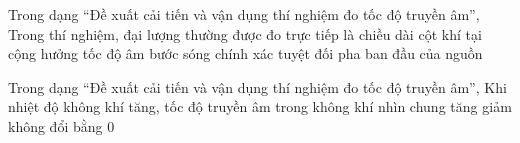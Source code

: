 \begin{ex}
Trong dạng “Đề xuất cải tiến và vận dụng thí nghiệm đo tốc độ truyền âm”, Trong thí nghiệm, đại lượng thường được đo trực tiếp là
\choice
{\True chiều dài cột khí tại cộng hưởng}
{tốc độ âm}
{bước sóng chính xác tuyệt đối}
{pha ban đầu của nguồn}
\end{ex}

\begin{ex}
Trong dạng “Đề xuất cải tiến và vận dụng thí nghiệm đo tốc độ truyền âm”, Khi nhiệt độ không khí tăng, tốc độ truyền âm trong không khí nhìn chung
\choice
{\True tăng}
{giảm}
{không đổi}
{bằng 0}
\end{ex}
